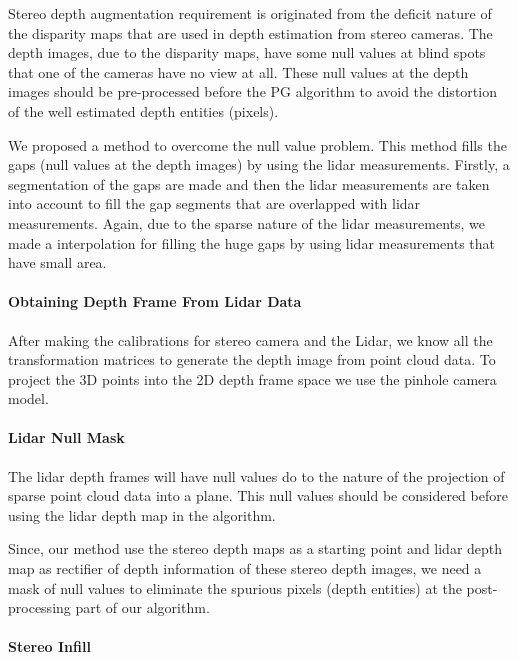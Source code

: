 \documentclass[conference]{IEEEtran}
\begin{document}
Stereo depth augmentation requirement is originated from the deficit nature of the disparity maps that are used in depth estimation from stereo cameras. The depth images, due to the disparity maps, have some null values at blind spots that one of the cameras have no view at all. These null values at the depth images should be pre-processed before the PG algorithm to avoid the distortion of the well estimated depth entities (pixels).

We proposed a method to overcome the null value problem. This method fills the gaps (null values at the depth images) by using the lidar measurements. Firstly, a segmentation of the gaps are made and then the lidar measurements are taken into account to fill the gap segments that are overlapped with lidar measurements. Again, due to the sparse nature of the lidar measurements, we made a interpolation for filling the huge gaps by using lidar measurements that have small area. 


\paragraph{Obtaining Depth Frame From Lidar Data}

After making the calibrations for stereo camera and the Lidar, we know all the transformation matrices to generate the depth image from point cloud data. To project the 3D points into the 2D depth frame space we use the pinhole camera model. 

\paragraph{Lidar Null Mask}

The lidar depth frames will have null values do to the nature of the projection of sparse point cloud data into a plane. This null values should be considered before using the lidar depth map in the algorithm.

Since, our method use the stereo depth maps as a starting point and lidar depth map as rectifier of depth information of these stereo depth images, we need a mask of null values to eliminate the spurious pixels (depth entities) at the post-processing part of our algorithm.

\paragraph{Stereo Infill}
\end{document}
